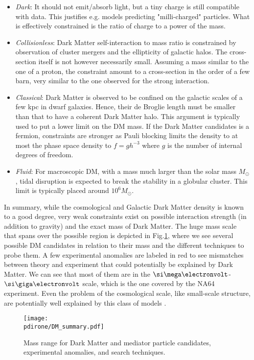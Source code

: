 \begin{itemize}
\item \textit{Dark}: It should not emit/absorb light, but a tiny charge is still compatible with data. This justifies e.g. models predicting "milli-charged" particles. What is effectively constrained is the ratio of charge to a power of the mass.
\item \textit{Collisionless}: Dark Matter self-interaction to mass ratio is constrained by observation of cluster mergers and the ellipticity of galactic halos. The cross-section itself is not however necessarily small. Assuming a mass similar to the one of a proton, the constraint amount to a cross-section in the order of a few barn, very similar to the one observed for the strong interaction.
\item \textit{Classical}: Dark Matter is observed to be confined on the galactic scales of a few kpc in dwarf galaxies. Hence, their de Broglie length must be smaller than that to have a coherent Dark Matter halo. This argument is typically used to put a lower limit on the DM mass. If the Dark Matter candidates is a fermion, constraints are stronger as Pauli blocking limits the density to at most the phase space density to $f=gh^{-3}$ where $g$ is the number of internal degrees of freedom.
\item \textit{Fluid}: For macroscopic DM, with a mass much larger than the solar mass $M_{\odot}$, tidal disruption is expected to break the stability in a globular cluster. This limit is typically placed around $10^6 M_{\odot}$.
\end{itemize}

In summary, while the cosmological and Galactic Dark Matter density is known to a good degree, very weak constraints exist on  possible interaction strength (in addition to gravity) and the exact mass of Dark Matter. The huge mass scale that spans over the possible region is depicted in Fig.\ref{fig:dm-mass-range}, where we see several possible DM candidates in relation to their mass and the different techniques to probe them. A few experimental anomalies are labeled in red to see mismatches between theory and experiment that could potentially be explained by Dark Matter. We can see that most of them are in the $\mev$-$\gev$ scale, which is the one covered by the NA64 experiment. Even the problem of the cosmological scale, like small-scale structure, are potentially well explained by this class of models \cite{battaglieri2017cosmic}.

\begin{figure}[bht!]
  \centering
  \texttt{[image: \\pdirone/DM\_summary.pdf]}
  \caption[Mass range for Dark Matter]{Mass range for Dark Matter and mediator particle candidates, experimental anomalies, and search techniques.}
  \label{fig:dm-mass-range}
\end{figure}

